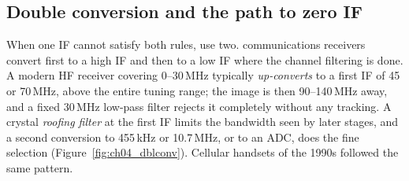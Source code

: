 \subsection{Double conversion and the path to zero IF}

When one IF cannot satisfy both rules, use two.  communications receivers convert first
to a high IF and then to a low IF where the channel filtering is done. A modern HF receiver covering 0--30\,MHz
typically \emph{up-converts} to a first IF of 45 or 70\,MHz, above the entire tuning range; the image is then
90--140\,MHz away, and a fixed 30\,MHz low-pass filter rejects it completely without any tracking. A crystal
\emph{roofing filter} at the first IF limits the bandwidth seen by later stages, and a second conversion to
455\,kHz or 10.7\,MHz, or to an ADC, does the fine selection (Figure~\ref{fig:ch04_dblconv}). Cellular
handsets of the 1990s followed the same pattern.

